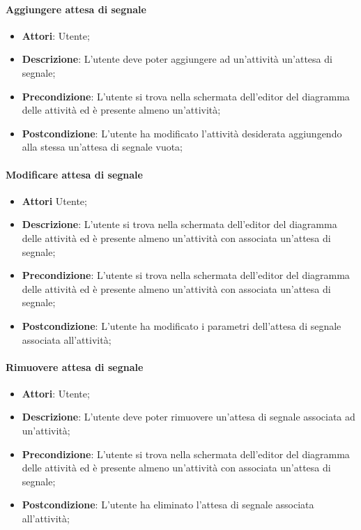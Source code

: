\paragraph{Aggiungere attesa di segnale}
\begin{itemize}
	\item \textbf{Attori}: Utente;
	\item \textbf{Descrizione}: L'utente deve poter aggiungere ad un'attività un'attesa di segnale;
	\item \textbf{Precondizione}: L'utente si trova nella schermata dell'editor del diagramma delle attività ed è presente almeno un'attività;
	\item \textbf{Postcondizione}: L'utente ha modificato l'attività desiderata aggiungendo alla stessa un'attesa di segnale vuota;
\end{itemize}

\paragraph{Modificare attesa di segnale}
\begin{itemize}
	\item \textbf{Attori} Utente;
	\item \textbf{Descrizione}: L'utente si trova nella schermata dell'editor del diagramma delle attività ed è presente almeno un'attività con associata un'attesa di segnale;
	\item \textbf{Precondizione}: L'utente si trova nella schermata dell'editor del diagramma delle attività ed è presente almeno un'attività con associata un'attesa di segnale;
	\item \textbf{Postcondizione}: L'utente ha modificato i parametri dell'attesa di segnale associata all'attività;
\end{itemize}

\paragraph{Rimuovere attesa di segnale}
\begin{itemize}
	\item \textbf{Attori}: Utente;
	\item \textbf{Descrizione}: L'utente deve poter rimuovere un'attesa di segnale associata ad un'attività;
	\item \textbf{Precondizione}: L'utente si trova nella schermata dell'editor del diagramma delle attività ed è presente almeno un'attività con associata un'attesa di segnale;
	\item \textbf{Postcondizione}: L'utente ha eliminato l'attesa di segnale associata all'attività;
\end{itemize}

